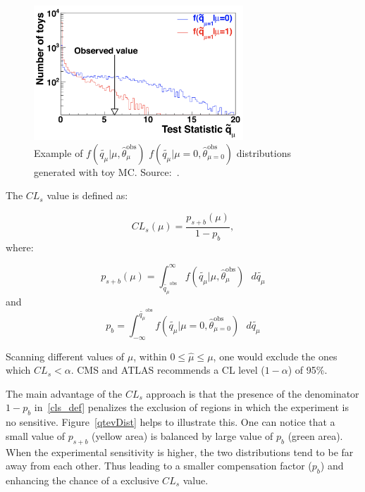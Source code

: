 \begin{figure}[htbp]
  \centering
  \includegraphics[width=0.7\textwidth,keepaspectratio]{figures_and_tables/cls/q_tilde.png}
  \caption{Example of $f(\tilde{q_{\mu}} \vert \mu, \hat{\theta}_{\mu}^{\text{obs}})$ $f(\tilde{q_{\mu}} \vert \mu=0, \hat{\theta}_{\mu = 0}^{\text{obs}})$ distributions generated with toy MC. Source:~\cite{cms_atlas_statistical_guidelines}.}
  \label{toy_mc_profile_likelihood_test}
\end{figure}

The $CL_s$ value is defined as:

\begin{equation}
  \label{cls_def}
  CL_s(\mu)=\frac{p_{s+b}(\mu)}{1-p_{b}},
\end{equation}
where:

\begin{equation}
  \label{cls_p_def1}
  p_{s+b}(\mu) = \int_{\tilde{q_{\mu}}^{\text{obs}}}^{\infty} f(\tilde{q_{\mu}} \vert \mu, \hat{\theta}_{\mu}^{\text{obs}}) \text{ }d\tilde{q_{\mu}}
\end{equation}
and
\begin{equation}
  \label{cls_p_def2}
  p_{b} = \int^{\tilde{q_{\mu}}^{\text{obs}}}_{-\infty} f(\tilde{q_{\mu}} \vert \mu=0, \hat{\theta}_{\mu = 0}^{\text{obs}}) \text{ }d\tilde{q_{\mu}}
\end{equation}

Scanning different values of $\mu$, within $0 \leqslant \hat{\mu} \leqslant \mu$, one would exclude the ones which $CL_s < \alpha$. CMS and ATLAS recommends a CL level ($1-\alpha$) of 95\%.

The main advantage of the $CL_s$ approach is that the presence of the denominator $1-p_{b}$ in~\ref{cls_def} penalizes the exclusion of regions in which the experiment is no sensitive. Figure~\ref{qtevDist} helps to illustrate this. One can notice that a small value of $p_{s+b}$ (yellow area) is balanced by large value of $p_{b}$ (green area). When the experimental sensitivity is higher, the two distributions tend to be far away from each other. Thus leading to a smaller compensation factor ($p_{b}$) and enhancing the chance of a exclusive $CL_s$ value.

